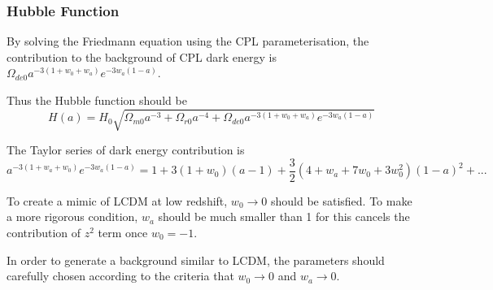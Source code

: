 \documentclass{article}
\begin{document}
\subsubsection{Hubble Function}

By solving the Friedmann equation using the CPL parameterisation, the contribution to the background of CPL dark energy is $\Omega_{de0}a^{-3(1+w_0+w_a)}e^{-3w_a(1-a)}$.

Thus the Hubble function should be
\begin{equation}
H(a)=H_0\sqrt{\Omega_{m0}a^{-3}+\Omega_{r0}a^{-4}+\Omega_{de0}a^{-3(1+w_0+w_a)}e^{-3w_a(1-a)}}
\end{equation}


The Taylor series of dark energy contribution is
\begin{equation}
a^{-3(1+w_a+w_0)}e^{-3w_a(1-a)}=1+3(1+w_0)(a-1)+\frac 3 2 (4+w_a+7w_0+3w_0^2)(1-a)^2+...\label{eq:CPL_HubbleEquation_Series}
\end{equation}

To create a mimic of LCDM at low redshift, $w_0\rightarrow 0$ should be satisfied. To make a more rigorous condition, $w_a$ should be much smaller than 1 for this cancels the contribution of $z^2$ term once $w_0=-1$.


In order to generate a background similar to LCDM, the parameters should carefully chosen according to the criteria that $w_0\rightarrow 0$ and $w_a\rightarrow 0$.
\end{document}
